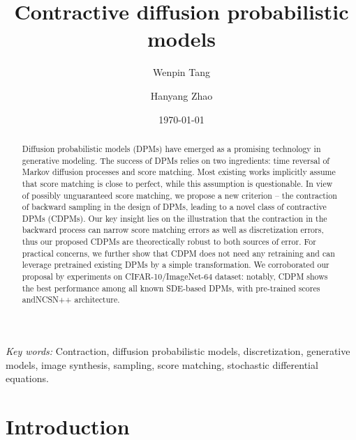 \documentclass[letterpaper,11pt,reqno]{amsart}
\numberwithin{equation}{section}
\begin{document}
\title[Contractive diffusion models]{Contractive diffusion probabilistic models}

\author[Wenpin Tang]{{Wenpin} Tang}
\address{Department of Industrial Engineering and Operations Research, Columbia University. 
} 

\author[Hanyang Zhao]{{Hanyang} Zhao}
\address{Department of Industrial Engineering and Operations Research, Columbia University. 
} 

\date{\today} 
\begin{abstract}
Diffusion probabilistic models (DPMs) have emerged as a promising technology in generative modeling. The success of DPMs relies on two ingredients: time reversal of Markov diffusion processes and score matching. Most existing works implicitly assume that score matching is close to perfect,
while this assumption is questionable. In view of possibly unguaranteed score matching, we propose a new criterion -- the contraction of backward sampling in the design of DPMs, leading to a novel class of contractive DPMs (CDPMs). Our key insight lies on the illustration that the contraction in the backward process can narrow score matching errors as well as discretization errors, thus our proposed CDPMs are theorectically robust to both sources of error. For practical concerns, we further show that CDPM does not need any retraining and can leverage pretrained existing DPMs by a simple transformation. We corroborated our proposal by experiments on CIFAR-10/ImageNet-64 dataset: notably, CDPM shows the best performance among all known SDE-based DPMs, with pre-trained scores andNCSN++ \cite{Song20} architecture. %
\end{abstract}

\maketitle
\textit{Key words:} Contraction, diffusion probabilistic models, discretization, generative models, image synthesis, sampling, score matching, stochastic differential equations.

\section{Introduction}
\label{sc1}
\end{document}
